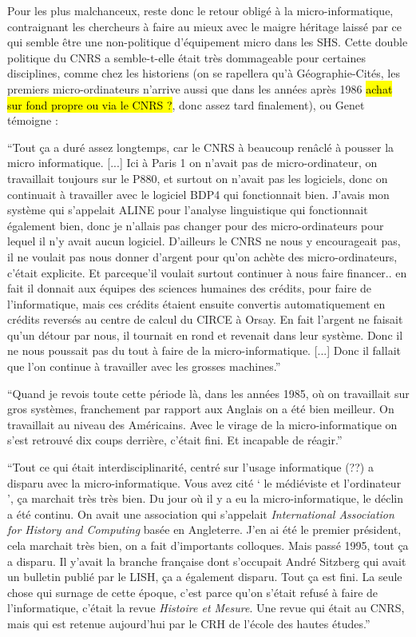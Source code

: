 Pour les plus malchanceux, reste donc le retour obligé à la micro-informatique, contraignant les chercheurs à faire au mieux avec le maigre héritage laissé par ce qui semble être une non-politique d'équipement micro dans les SHS. Cette double politique du CNRS a semble-t-elle était très dommageable pour certaines disciplines, comme chez les historiens (on se rapellera qu'à Géographie-Cités, les premiers micro-ordinateurs n'arrive aussi que dans les années après 1986 \hl{achat sur fond propre ou via le CNRS ?}, donc assez tard finalement), ou Genet témoigne : 

\enquote{Tout ça a duré assez longtemps, car le CNRS à beaucoup renâclé à pousser la micro informatique. [...] Ici à Paris 1 on n’avait pas de micro-ordinateur, on travaillait toujours sur le P880, et surtout on n’avait pas les logiciels, donc on continuait à travailler avec le logiciel BDP4 qui fonctionnait bien. J'avais mon système qui s'appelait ALINE pour l'analyse linguistique qui fonctionnait également bien, donc je n'allais pas changer pour des micro-ordinateurs pour lequel il n'y avait aucun logiciel. D'ailleurs le CNRS ne nous y encourageait pas, il ne voulait pas nous donner d'argent pour qu'on achète des micro-ordinateurs, c'était explicite. Et parceque'il voulait surtout continuer à nous faire financer.. en fait il donnait aux équipes des sciences humaines des crédits, pour faire de l'informatique, mais ces crédits étaient ensuite convertis automatiquement en crédits reversés au centre de calcul du CIRCE à Orsay. En fait l'argent ne faisait qu'un détour par nous, il tournait en rond et revenait dans leur système. Donc il ne nous poussait pas du tout à faire de la micro-informatique. [...] Donc il fallait que l'on continue à travailler avec les grosses machines.}

\enquote{Quand je revois toute cette période là, dans les années 1985, où on travaillait sur gros systèmes, franchement par rapport aux Anglais on a été bien meilleur. On travaillait au niveau des Américains. Avec le virage de la micro-informatique on s'est retrouvé dix coups derrière, c'était fini. Et incapable de réagir.}

\enquote{Tout ce qui était interdisciplinarité, centré sur l'usage informatique (??) a disparu avec la micro-informatique. Vous avez cité \enquote{ le médiéviste et l'ordinateur }, ça marchait très très bien. Du jour où il y a eu la micro-informatique, le déclin a été continu. On avait une association qui s'appelait \textit{International Association for History and Computing} basée en Angleterre. J'en ai été le premier président, cela marchait très bien, on a fait d'importants colloques. Mais passé 1995, tout ça a disparu. Il y'avait la branche française dont s'occupait André Sitzberg qui avait un bulletin publié par le LISH, ça a également disparu. Tout ça est fini. La seule chose qui surnage de cette époque, c'est parce qu'on s'était refusé à faire de l'informatique, c'était la revue \textit{Histoire et Mesure}. Une revue qui était au CNRS, mais qui est retenue aujourd'hui par le CRH de l'école des hautes études.} 

